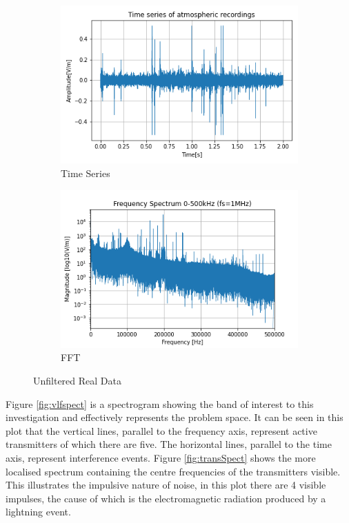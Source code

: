 \begin{figure}[h!]
    \begin{subfigure}[b]{0.5\textwidth}
        \centering
        \includegraphics[width = \textwidth]{figs/sig_character/timeseries.png}
        \caption{Time Series}
        \label{fig:realData}
    \end{subfigure}
    \begin{subfigure}[b]{0.5\textwidth}
        \centering
        \includegraphics[width = \textwidth]{figs/sig_character/fft_data.png}
        \caption{FFT}
        \label{fig:realFFT}
    \end{subfigure}
    \caption{Unfiltered Real Data}
\end{figure}


Figure \ref{fig:vlfspect} is a spectrogram showing the band of interest to this investigation and effectively represents the problem space. It can be seen in this plot that the vertical lines, parallel to the frequency axis, represent active transmitters of which there are five. The horizontal lines, parallel to the time axis, represent interference events. Figure \ref{fig:transSpect} shows the more localised spectrum containing the centre frequencies of the transmitters visible. This illustrates the impulsive nature of noise, in this plot there are 4 visible impulses, the cause of which is the electromagnetic radiation produced by a lightning event. 

